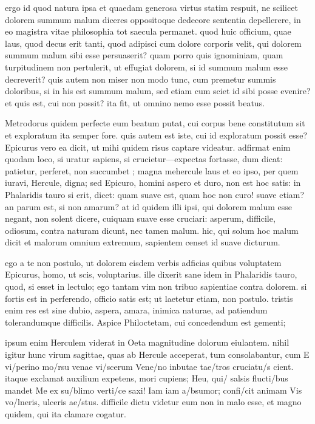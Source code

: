  ergo id quod natura ipsa et quaedam generosa virtus statim respuit, ne scilicet dolorem summum malum diceres oppositoque dedecore sententia depellerere, in eo magistra vitae philosophia tot saecula permanet. quod huic officium, quae laus, quod decus erit tanti, quod adipisci cum dolore corporis velit, qui dolorem summum malum sibi esse persuaserit? quam porro quis ignominiam, quam turpitudinem non pertulerit, ut effugiat dolorem, si id summum malum esse decreverit? quis autem non miser non modo tunc, cum premetur summis doloribus, si in his est summum malum, sed etiam cum sciet id sibi posse evenire? et quis est, cui non possit? ita fit, ut omnino nemo esse possit beatus.

 Metrodorus quidem perfecte eum beatum putat, cui corpus bene constitutum sit et exploratum ita semper fore. quis autem est iste, cui id exploratum possit esse? Epicurus vero ea dicit, ut mihi quidem risus captare videatur. adfirmat enim quodam loco, si uratur sapiens, si crucietur—expectas fortasse, dum dicat: patietur, perferet, non succumbet ; magna mehercule laus et eo ipso, per quem iuravi, Hercule, digna; sed Epicuro, homini aspero et duro, non est hoc satis: in Phalaridis tauro si erit, dicet: quam suave est, quam hoc non curo! suave etiam? an parum est, si non amarum? at id quidem illi ipsi, qui dolorem malum esse negant, non solent dicere, cuiquam suave esse cruciari: asperum, difficile, odiosum, contra naturam dicunt, nec tamen malum. hic, qui solum hoc malum dicit et malorum omnium extremum, sapientem censet id suave dicturum.

 ego a te non postulo, ut dolorem eisdem verbis adficias quibus voluptatem Epicurus, homo, ut scis, voluptarius. ille dixerit sane idem in Phalaridis tauro, quod, si esset in lectulo; ego tantam vim non tribuo sapientiae contra dolorem. si fortis est in perferendo, officio satis est; ut laetetur etiam, non postulo. tristis enim res est sine dubio, aspera, amara, inimica naturae, ad patiendum tolerandumque difficilis. Aspice Philoctetam, cui concedendum est gementi;

 ipsum enim Herculem viderat in Oeta magnitudine dolorum eiulantem. nihil igitur hunc virum sagittae, quas ab Hercule acceperat, tum consolabantur, cum E vi/perino mo/rsu venae vi/scerum Vene/no inbutae tae/tros cruciatu/s cient. itaque exclamat auxilium expetens, mori cupiens; Heu, qui/ salsis flucti/bus mandet Me ex su/blimo verti/ce saxi! Iam iam a/bsumor; confi/cit animam Vis vo/lneris, ulceris ae/stus. difficile dictu videtur eum non in malo esse, et magno quidem, qui ita clamare cogatur.


